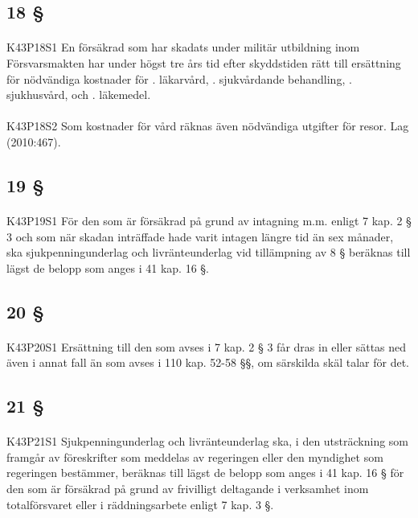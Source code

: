 \documentclass[a4paper,notitlepage,openany,10pt]{book}
\begin{document}
\subsection*{18 §}
\paragraph*{}
{\tiny K43P18S1}
En försäkrad som har skadats under militär utbildning inom Försvarsmakten har under högst tre års tid efter skyddstiden rätt till ersättning för nödvändiga kostnader för
. läkarvård,
. sjukvårdande behandling,
. sjukhusvård, och
. läkemedel.
\paragraph*{}
{\tiny K43P18S2}
Som kostnader för vård räknas även nödvändiga utgifter för resor.
Lag (2010:467).
\subsection*{19 §}
\paragraph*{}
{\tiny K43P19S1}
För den som är försäkrad på grund av intagning m.m.
enligt 7 kap. 2 § 3 och som när skadan inträffade hade varit intagen längre tid än sex månader, ska sjukpenningunderlag och livränteunderlag vid tillämpning av 8 § beräknas till lägst de belopp som anges i 41 kap. 16 §.
\subsection*{20 §}
\paragraph*{}
{\tiny K43P20S1}
Ersättning till den som avses i 7 kap. 2 § 3 får dras in eller sättas ned även i annat fall än som avses i 110 kap. 52-58 §§, om särskilda skäl talar för det.
\subsection*{21 §}
\paragraph*{}
{\tiny K43P21S1}
Sjukpenningunderlag och livränteunderlag ska, i den utsträckning som framgår av föreskrifter som meddelas av regeringen eller den myndighet som regeringen bestämmer, beräknas till lägst de belopp som anges i 41 kap. 16 § för den som är försäkrad på grund av frivilligt deltagande i verksamhet inom totalförsvaret eller i räddningsarbete enligt 7 kap. 3 §.
\end{document}
